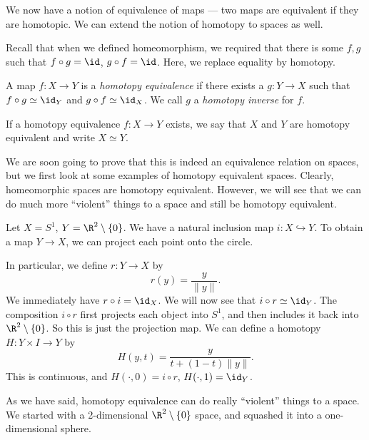 \documentclass[a4paper]{article}
\begin{document}
We now have a notion of equivalence of maps --- two maps are equivalent if they are homotopic. We can extend the notion of homotopy to spaces as well.

Recall that when we defined homeomorphism, we required that there is some $f, g$ such that $f\circ g = \id$, $g\circ f = \id$. Here, we replace equality by homotopy.
\begin{defi}
  A map $f: X\to Y$ is a \emph{homotopy equivalence} if there exists a $g: Y\to X$ such that $f\circ g \simeq \id_Y$ and $g\circ f \simeq \id_X$. We call $g$ a \emph{homotopy inverse} for $f$.

  If a homotopy equivalence $f: X\to Y$ exists, we say that $X$ and $Y$ are homotopy equivalent and write $X\simeq Y$.
\end{defi}
We are soon going to prove that this is indeed an equivalence relation on spaces, but we first look at some examples of homotopy equivalent spaces. Clearly, homeomorphic spaces are homotopy equivalent. However, we will see that we can do much more ``violent'' things to a space and still be homotopy equivalent.
\begin{eg}
  Let $X = S^1$, $Y = \R^2 \setminus \{0\}$. We have a natural inclusion map $i: X\hookrightarrow Y$. To obtain a map $Y \to X$, we can project each point onto the circle.
  \begin{center}
  \end{center}
  In particular, we define $r: Y\to X$ by
  \[
    r(y) = \frac{y}{\|y\|}.
  \]
  We immediately have $r\circ i = \id_X$. We will now see that $i\circ r \simeq \id_Y$. The composition $i\circ r$ first projects each object into $S^1$, and then includes it back into $\R^2 \setminus \{0\}$. So this is just the projection map. We can define a homotopy $H: Y\times I \to Y$ by
  \[
    H(y, t) = \frac{y}{t + (1 - t)\|y\|}.
  \]
  This is continuous, and $H(\cdot, 0) = i\circ r$, $H(\cdot, 1) = \id_Y$.
\end{eg}
As we have said, homotopy equivalence can do really ``violent'' things to a space. We started with a 2-dimensional $\R^2\setminus \{0\}$ space, and squashed it into a one-dimensional sphere.
\end{document}
